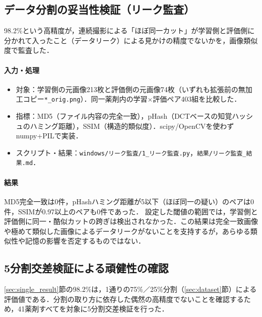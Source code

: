 \documentclass[dvipdfmx]{jsarticle}
\begin{document}
\subsection{データ分割の妥当性検証（リーク監査）}\label{sec:leak}

98.2\%という高精度が，連続撮影による「ほぼ同一カット」が学習側と評価側に分かれて入ったこと（データリーク）による見かけの精度でないかを，画像類似度で監査した．

\paragraph{入力・処理}
\begin{itemize}
  \item 対象：学習側の元画像213枚と評価側の元画像74枚（いずれも拡張前の無加工コピー\texttt{*\_orig.png}）．同一薬剤内の学習$\times$評価ペア403組を比較した．
  \item 指標：MD5（ファイル内容の完全一致），pHash（DCTベースの知覚ハッシュのハミング距離），SSIM（構造的類似度）．scipy/OpenCVを使わずnumpy+PILで実装．
  \item スクリプト・結果：\texttt{windows/リーク監査/1\_リーク監査.py}，\texttt{結果/リーク監査\_結果.md}．
\end{itemize}

\paragraph{結果}
MD5完全一致は0件，pHashハミング距離が5以下（ほぼ同一の疑い）のペアは0件，SSIMが0.97以上のペアも0件であった．
設定した閾値の範囲では，学習側と評価側に同一・酷似カットの跨ぎは検出されなかった．この結果は完全一致画像や極めて類似した画像によるデータリークがないことを支持するが，あらゆる類似性や記憶の影響を否定するものではない．

\subsection{5分割交差検証による頑健性の確認}\label{sec:cv}

\ref{sec:single_result}節の98.2\%は，1通りの75\%／25\%分割（\ref{sec:dataset}節）による評価値である．分割の取り方に依存した偶然の高精度でないことを確認するため，41薬剤すべてを対象に5分割交差検証を行った．
\end{document}
